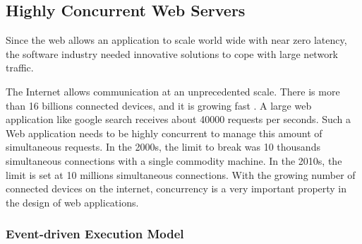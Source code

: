 
\subsection{Highly Concurrent Web Servers} \label{chapter2:web-as-a-platform:web-servers}


Since the web allows an application to scale world wide with near zero latency, the software industry needed innovative solutions to cope with large network traffic.



The Internet allows communication at an unprecedented scale.
There is more than 16 billions connected devices, and it is growing fast \cite{Hilbert2011}.
A large web application like google search receives about \num{40000} requests per seconds.
Such a Web application needs to be highly concurrent to manage this amount of simultaneous requests.
In the 2000s, the limit to break was 10 thousands simultaneous connections with a single commodity machine.
In the 2010s, the limit is set at 10 millions simultaneous connections.
With the growing number of connected devices on the internet, concurrency is a very important property in the design of web applications.

\subsubsection{Event-driven Execution Model} \label{chapter2:web-as-a-platform:javascript:event-loop}

